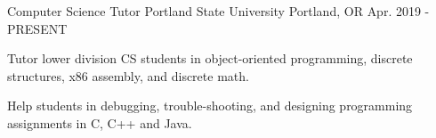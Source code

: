 
\begin{cventries}
  \cventry
    {Computer Science Tutor} %
    {Portland State University} %
    {Portland, OR} %
    {Apr. 2019 - PRESENT} %
    {
      \begin{cvitems} %
        \item {Tutor lower division CS students in object-oriented programming, discrete structures, x86 assembly, and discrete math.}
        \item {Help students in debugging, trouble-shooting, and designing programming assignments in C, C++ and Java.}
      \end{cvitems}
    }
\end{cventries}
